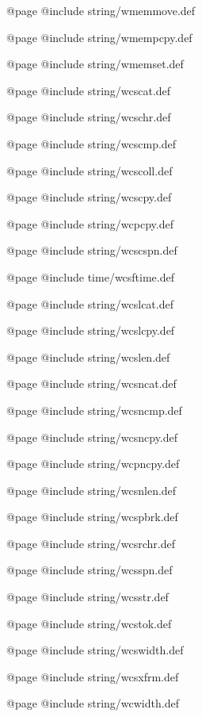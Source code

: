 @page
@include string/wmemmove.def

@page
@include string/wmempcpy.def

@page
@include string/wmemset.def

@page
@include string/wcscat.def

@page
@include string/wcschr.def

@page
@include string/wcscmp.def

@page
@include string/wcscoll.def

@page
@include string/wcscpy.def

@page
@include string/wcpcpy.def

@page
@include string/wcscspn.def

@page
@include time/wcsftime.def

@page
@include string/wcslcat.def

@page
@include string/wcslcpy.def

@page
@include string/wcslen.def

@page
@include string/wcsncat.def

@page
@include string/wcsncmp.def

@page
@include string/wcsncpy.def

@page
@include string/wcpncpy.def

@page
@include string/wcsnlen.def

@page
@include string/wcspbrk.def

@page
@include string/wcsrchr.def

@page
@include string/wcsspn.def

@page
@include string/wcsstr.def

@page
@include string/wcstok.def

@page
@include string/wcswidth.def

@page
@include string/wcsxfrm.def

@page
@include string/wcwidth.def

